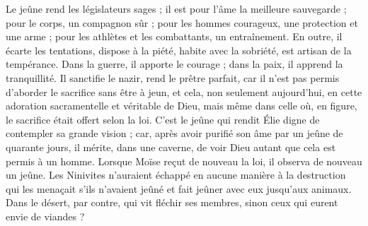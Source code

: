 Le jeûne rend les législateurs sages ; il est pour l’âme la meilleure sauvegarde ; pour le corps, un compagnon sûr ; pour les hommes courageux, une protection et une arme ; pour les athlètes et les combattants, un entraînement. En outre, il écarte les tentations, dispose à la piété, habite avec la sobriété, est artisan de la tempérance. Dans la guerre, il apporte le courage ; dans la paix, il apprend la tranquillité. Il sanctifie le nazir, rend le prêtre parfait, car il n’est pas permis d’aborder le sacrifice sans être à jeun, et cela, non seulement aujourd’hui, en cette adoration sacramentelle et véritable de Dieu, mais même dans celle où, en figure, le sacrifice était offert selon la loi. C’est le jeûne qui rendit Élie digne de contempler sa grande vision ; car, après avoir purifié son âme par un jeûne de quarante jours, il mérite, dans une caverne, de voir Dieu autant que cela est permis à un homme. Lorsque Moïse reçut de nouveau la loi, il observa de nouveau un jeûne. Les Ninivites n’auraient échappé en aucune manière à la destruction qui les menaçait s’ils n’avaient jeûné et fait jeûner avec eux jusqu’aux animaux. Dans le désert, par contre, qui vit fléchir ses membres, sinon ceux qui eurent envie de viandes ?